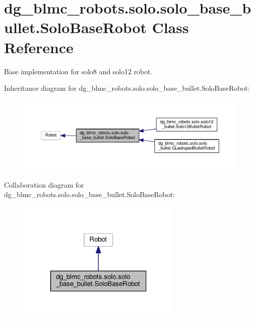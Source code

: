\hypertarget{classdg__blmc__robots_1_1solo_1_1solo__base__bullet_1_1SoloBaseRobot}{}\section{dg\+\_\+blmc\+\_\+robots.\+solo.\+solo\+\_\+base\+\_\+bullet.\+Solo\+Base\+Robot Class Reference}
\label{classdg__blmc__robots_1_1solo_1_1solo__base__bullet_1_1SoloBaseRobot}


Base implementation for solo8 and solo12 robot.  




Inheritance diagram for dg\+\_\+blmc\+\_\+robots.\+solo.\+solo\+\_\+base\+\_\+bullet.\+Solo\+Base\+Robot\+:
\nopagebreak
\begin{figure}[H]
\begin{center}
\leavevmode
\includegraphics[width=350pt]{classdg__blmc__robots_1_1solo_1_1solo__base__bullet_1_1SoloBaseRobot__inherit__graph}
\end{center}
\end{figure}


Collaboration diagram for dg\+\_\+blmc\+\_\+robots.\+solo.\+solo\+\_\+base\+\_\+bullet.\+Solo\+Base\+Robot\+:
\nopagebreak
\begin{figure}[H]
\begin{center}
\leavevmode
\includegraphics[width=223pt]{classdg__blmc__robots_1_1solo_1_1solo__base__bullet_1_1SoloBaseRobot__coll__graph}
\end{center}
\end{figure}
